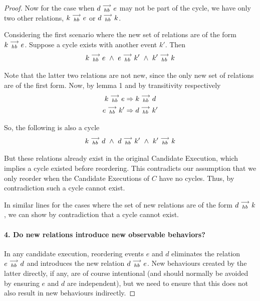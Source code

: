 \begin{proof}

        Now for the case when $d\stackrel{\longrightarrow}{_{hb}}e$ may not be part of the cycle, we have only two other relations, $k\stackrel{\longrightarrow}{_{hb}}e$ or $d\stackrel{\longrightarrow}{_{hb}}k$.
        
        Considering the first scenario where the new set of relations are of the form $k\stackrel{\longrightarrow}{_{hb}}e$. Suppose a cycle exists with another event $k'$. Then 
        \[
            k\stackrel{\longrightarrow}{_{hb}}e \ \wedge \
            e\stackrel{\longrightarrow}{_{hb}}k' \ \wedge \
            k'\stackrel{\longrightarrow}{_{hb}}k
        \]
        
        Note that the latter two relations are not new, since the only new set of relations are of the first form. Now, by lemma 1 and by transitivity respectively
        \begin{gather*}
            k\stackrel{\longrightarrow}{_{hb}}e \Rightarrow k\stackrel{\longrightarrow}{_{hb}}d \\
            e\stackrel{\longrightarrow}{_{hb}}k' \Rightarrow d\stackrel{\longrightarrow}{_{hb}}k'    
        \end{gather*}
        
        So, the following is also a cycle
        \[
            k\stackrel{\longrightarrow}{_{hb}}d \ \wedge \
            d\stackrel{\longrightarrow}{_{hb}}k' \ \wedge \
            k'\stackrel{\longrightarrow}{_{hb}}k
        \]
        
        But these relations already exist in the original Candidate Execution, which implies a cycle existed before reordering. This contradicts our assumption that we only reorder when the Candidate Executions of $C$ have no cycles. Thus, by contradiction such a cycle cannot exist.
        
        In similar lines for the cases where the set of new relations are of the form $d\stackrel{\longrightarrow}{_{hb}}k$, we can show by contradiction that a cycle cannot exist.


        \paragraph{4. Do new relations introduce new observable behaviors?}
        In any candidate execution, reordering events $e$ and $d$ eliminates the relation $e\stackrel{\longrightarrow}{_{hb}}d$ and introduces the new relation $d\stackrel{\longrightarrow}{_{hb}}e$. 
        New behaviours created by the latter directly, if any, are 
        of course intentional (and should normally be avoided by ensuring $e$ and $d$ are independent), but we need to ensure that this does not also result in new behaviours indirectly. 
        

\end{proof}
